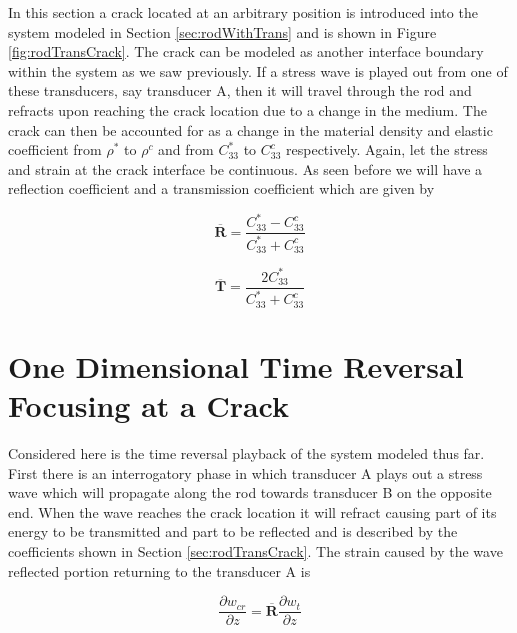 In this section a crack located at an arbitrary position is introduced into the system modeled in Section \ref{sec:rodWithTrans} and is shown in Figure \ref{fig:rodTransCrack}. The crack can be modeled as another interface boundary within the system as we saw previously. If a stress wave is played out from one of these transducers, say transducer A, then it will travel through the rod and refracts upon reaching the crack location due to a change in the medium. The crack can then be accounted for as a change in the material density and elastic coefficient from $\rho ^*$ to $\rho ^c$ and from $C^*_{33}$ to $C^c_{33}$ respectively. Again, let the stress and strain at the crack interface be continuous. As seen before we will have a reflection coefficient and a transmission coefficient which are given by

\begin{equation}
\boldsymbol{\overline{R}} = \frac{C^*_{33} - C^c_{33}}{C^*_{33} + C^c_{33}}
\end{equation}

\begin{equation}
\boldsymbol{\overline{T}} = \frac{2C^*_{33}}{C^*_{33} + C^c_{33}}
\end{equation}



\section{One Dimensional Time Reversal Focusing at a Crack}
Considered here is the time reversal playback of the system modeled thus far. First there is an interrogatory phase in which transducer A plays out a stress wave which will propagate along the rod towards transducer B on the opposite end. When the wave reaches the crack location it will refract causing part of its energy to be transmitted and part to be reflected and is described by the coefficients shown in Section \ref{sec:rodTransCrack}. The strain caused by the wave reflected portion returning to the transducer A is

\begin{equation}
\frac{\partial w_{cr}}{\partial z} = \overline{\boldsymbol{R}}\frac{\partial w_t}{\partial z}
\label{eq:reflStrain}
\end{equation}

